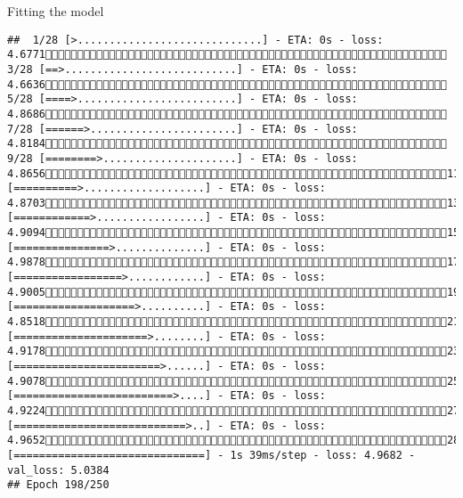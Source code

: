 \documentclass[
  ignorenonframetext,
]{beamer}
\begin{document}
\begin{frame}[fragile]{Fitting the model}
\begin{verbatim}
##  1/28 [>.............................] - ETA: 0s - loss: 4.6771 3/28 [==>...........................] - ETA: 0s - loss: 4.6636 5/28 [====>.........................] - ETA: 0s - loss: 4.8686 7/28 [======>.......................] - ETA: 0s - loss: 4.8184 9/28 [========>.....................] - ETA: 0s - loss: 4.865611/28 [==========>...................] - ETA: 0s - loss: 4.870313/28 [============>.................] - ETA: 0s - loss: 4.909415/28 [===============>..............] - ETA: 0s - loss: 4.987817/28 [=================>............] - ETA: 0s - loss: 4.900519/28 [===================>..........] - ETA: 0s - loss: 4.851821/28 [=====================>........] - ETA: 0s - loss: 4.917823/28 [=======================>......] - ETA: 0s - loss: 4.907825/28 [=========================>....] - ETA: 0s - loss: 4.922427/28 [===========================>..] - ETA: 0s - loss: 4.965228/28 [==============================] - 1s 39ms/step - loss: 4.9682 - val_loss: 5.0384
## Epoch 198/250

\end{verbatim}
\end{frame}
\end{document}
